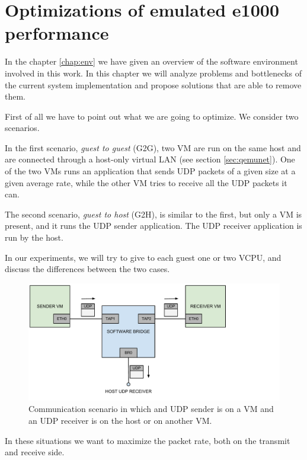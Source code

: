 \chapter{Optimizations of emulated e1000 performance}
In the chapter \ref{chap:env} we have given an overview of the software environment involved in this work.
In this chapter we will analyze problems and bottlenecks of the current system implementation and propose solutions that are able
to remove them.

\vspace{0.5cm}

First of all we have to point out what we are going to optimize. We consider two scenarios.

In the first scenario, \emph{guest to guest} (G2G), two VM are run on the same host and are connected through a host-only virtual LAN (see 
section \ref{sec:qemunet}). One of the two VMs runs an application that sends UDP packets of a given size at a given average rate, while 
the other VM tries to receive all the UDP packets it can.

The second scenario, \emph{guest to host} (G2H), is similar to the first, but only a VM is present, and it runs the UDP sender application. The UDP receiver application
is run by the host.

In our experiments, we will try to give to each guest one or two VCPU, and discuss the differences between the two cases.

\begin{figure}[bt]
\centering
\includegraphics[scale = 0.60]{scenario.pdf}
\caption{Communication scenario in which and UDP sender is on a VM and an UDP receiver is on the host or on another VM.}
\label{fig:scenario}
\end{figure}

\vspace{0.5cm}

In these situations we want to maximize the packet rate, both on the transmit and receive side.


